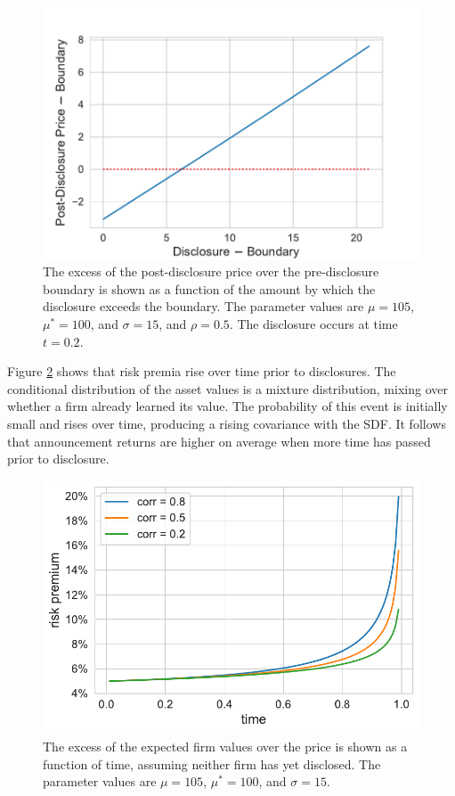 \documentclass[ecta,nameyear,draft]{econsocart}
\theoremstyle{theorem}
\numberwithin{lemma}{section}
\numberwithin{proposition}{section}
\numberwithin{equation}{section}
\numberwithin{figure}{section}
\begin{document}
\begin{figure}[htp]\caption{The excess of the post-disclosure price over the pre-disclosure boundary is shown as a function of the amount by which the disclosure exceeds the boundary.  The parameter values are $\mu=105$, $\mu^*=100$, and $\sigma=15$, and $\rho=0.5$.  The disclosure occurs at time $t=0.2$.\label{fig1}}
\begin{center}
    \includegraphics[scale=0.8]{Figures/DisclosurePostDisclosure.pdf}
\end{center}
\end{figure}

Figure \ref{fig2} shows that risk premia rise over time prior to disclosures.  The conditional distribution of the asset values is a mixture distribution, mixing over whether a firm already learned its value.  The probability of this event is initially small and rises over time, producing a rising covariance with the SDF.  It follows that announcement returns are higher on average when more time has passed prior to disclosure.

\begin{figure}[htp]\caption{The excess of the expected firm values over the price is shown as a function of time, assuming neither firm has yet disclosed.    The parameter values are $\mu=105$, $\mu^*=100$, and $\sigma=15$.\label{fig2}}
\begin{center}
    \includegraphics[scale=0.8]{Figures/RiskPremia.pdf}
\end{center}
\end{figure}
\end{document}
